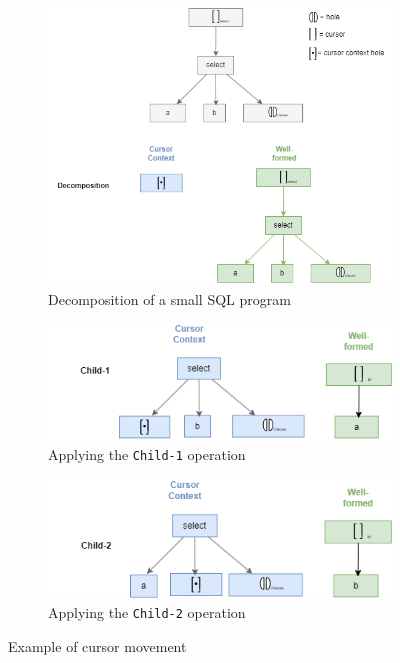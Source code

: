 \begin{figure}[H]
  \centering
  \begin{subfigure}[b]{0.65\textwidth}
    \centering
    \includegraphics[width=\textwidth]{img/slq-decomp-only.drawio.png}
    \caption{Decomposition of a small SQL program}
    \label{subfig:decomp-only}
  \end{subfigure}
  \hfill
  \begin{subfigure}[b]{0.65\textwidth}
    \centering
    \includegraphics[width=\textwidth]{img/sql-child1.drawio.png}
    \caption{Applying the \texttt{Child-1} operation}
    \label{subfig:child1}
  \end{subfigure}
  \hfill
  \begin{subfigure}[b]{0.65\textwidth}
    \centering
    \includegraphics[width=\textwidth]{img/sql-child2.drawio.png}
    \caption{Applying the \texttt{Child-2} operation}
    \label{subfig:child2}
  \end{subfigure}
  \caption{Example of cursor movement}
  \label{fig:movement-example}
\end{figure}


